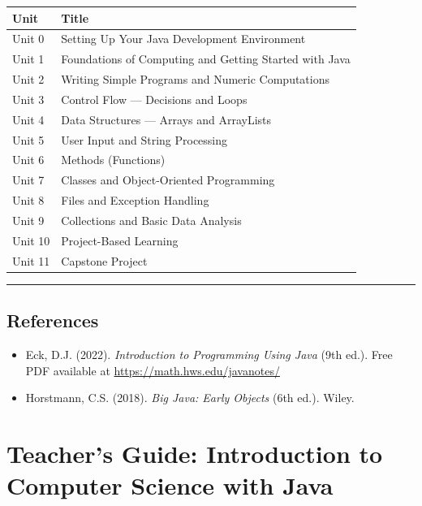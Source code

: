 \documentclass[
  justified,
  openright,
]{tufte-book}
\providecommand{\tightlist}{%
  \setlength{\itemsep}{0pt}\setlength{\parskip}{0pt}}
\begin{document}
{\def\LTcaptype{none} %
\begin{longtable}[]{@{}ll@{}}
\toprule\noalign{}
Unit & Title \\
\midrule\noalign{}
\endhead
\bottomrule\noalign{}
\endlastfoot
Unit 0 & Setting Up Your Java Development Environment \\
Unit 1 & Foundations of Computing and Getting Started with Java \\
Unit 2 & Writing Simple Programs and Numeric Computations \\
Unit 3 & Control Flow --- Decisions and Loops \\
Unit 4 & Data Structures --- Arrays and ArrayLists \\
Unit 5 & User Input and String Processing \\
Unit 6 & Methods (Functions) \\
Unit 7 & Classes and Object-Oriented Programming \\
Unit 8 & Files and Exception Handling \\
Unit 9 & Collections and Basic Data Analysis \\
Unit 10 & Project-Based Learning \\
Unit 11 & Capstone Project \\
\end{longtable}
}

\begin{center}\rule{0.5\linewidth}{0.5pt}\end{center}

\subsection{References}\label{references}

\begin{itemize}
\tightlist
\item
  Eck, D.J. (2022). \emph{Introduction to Programming Using Java} (9th
  ed.). Free PDF available at \url{https://math.hws.edu/javanotes/}
\item
  Horstmann, C.S. (2018). \emph{Big Java: Early Objects} (6th ed.).
  Wiley.
\end{itemize}

\newpage

\section{Teacher's Guide: Introduction to Computer Science with
Java}\label{teachers-guide-introduction-to-computer-science-with-java}
\end{document}
